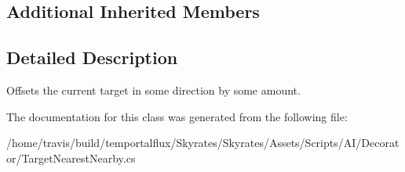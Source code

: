 \subsection*{Additional Inherited Members}


\subsection{Detailed Description}
Offsets the current target in some direction by some amount. 



The documentation for this class was generated from the following file\-:\begin{DoxyCompactItemize}
\item 
/home/travis/build/temportalflux/\-Skyrates/\-Skyrates/\-Assets/\-Scripts/\-A\-I/\-Decorator/Target\-Nearest\-Nearby.\-cs\end{DoxyCompactItemize}
